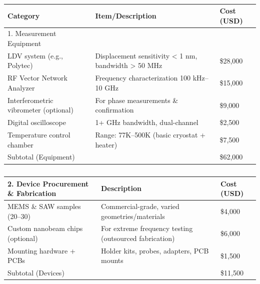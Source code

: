 \documentclass[preprint]{revtex4-2}
\begin{document}
\begin{table}
    \footnotesize
    \centering
    \begin{tabular}{lll}
        \toprule
        \textbf{Category} & \textbf{Item/Description} & \textbf{Cost (USD)} \\
        \midrule
        1. Measurement Equipment &  &  \\
        LDV system (e.g., Polytec) & Displacement sensitivity < 1 nm, bandwidth > 50 MHz & \$28,000 \\
        RF Vector Network Analyzer & Frequency characterization 100 kHz–10 GHz & \$15,000 \\
        Interferometric vibrometer (optional) & For phase measurements \& confirmation & \$9,000 \\
        Digital oscilloscope &  1+ GHz bandwidth, dual-channel & \$2,500 \\
        Temperature control chamber & Range: 77K–500K (basic cryostat + heater) & \$7,500 \\
        Subtotal (Equipment) &  & \$62,000 \\
        \bottomrule
    \end{tabular}
    \caption{}
    \label{tab:equipment}
\end{table}


\begin{table}
    \footnotesize
        \centering
        \begin{tabular}{lll}
            \toprule
            \textbf{2. Device Procurement \& Fabrication} & \textbf{Description} & \textbf{Cost (USD)} \\
            \midrule
            MEMS \& SAW samples (20–30) & Commercial-grade, varied geometries/materials & \$4,000 \\
            Custom nanobeam chips (optional) & For extreme frequency testing (outsourced fabrication) & \$6,000 \\
            Mounting hardware + PCBs & Holder kits, probes, adapters, PCB mounts & \$1,500 \\
            Subtotal (Devices) &  & \$11,500 \\
            \bottomrule
        \end{tabular}
        \caption{}
        \label{tab:devices}
\end{table}
\end{document}
